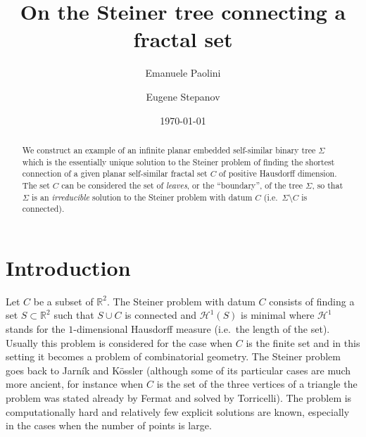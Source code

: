 \documentclass{amsart}
\author[Paolini]{Emanuele Paolini}
\author[Stepanov]{Eugene Stepanov}
\date{\today}
\title{On the Steiner tree connecting a fractal set}
\newcommand{\RR}{\mathbb R}
\renewcommand{\H}{\mathcal H}
\renewcommand{\H}{\mathcal{H}}
\theoremstyle{definition}
\theoremstyle{remark}
\begin{document}
\begin{abstract}
We construct an example of an infinite planar embedded self-similar binary tree  
$\Sigma$ which is the essentially unique solution to the Steiner problem of finding 
the shortest connection of a given planar self-similar fractal set $C$
of positive Hausdorff dimension.
The set $C$ can be considered the set of \emph{leaves}, or the ``boundary'',
of the tree $\Sigma$,
so that $\Sigma$ is an \emph{irreducible} solution to the Steiner problem
with datum $C$ (i.e.\ $\Sigma\setminus C$ is connected).
\end{abstract}

\maketitle

\section{Introduction}

Let $C$ be a subset of $\RR^2$.
The Steiner problem with datum $C$ consists of finding a set $S\subset \RR^2$ 
such that $S\cup C$ is connected and $\H^1(S)$ is minimal where $\H^1$ stands 
for the $1$-dimensional Hausdorff measure (i.e.\ the length of the set).
Usually this problem is considered for the case when $C$ is the finite 
set and in this setting it becomes a problem of combinatorial geometry. 
The Steiner problem goes back to Jarník and Kössler \cite{JarKos34} 
(although some of its particular cases are much more ancient, for instance 
when $C$ is the set of the three vertices of a triangle the problem was 
stated already by Fermat and solved by Torricelli).
The problem is computationally hard and relatively few explicit solutions 
are known, especially in the cases when the number of points is large.
\end{document}
